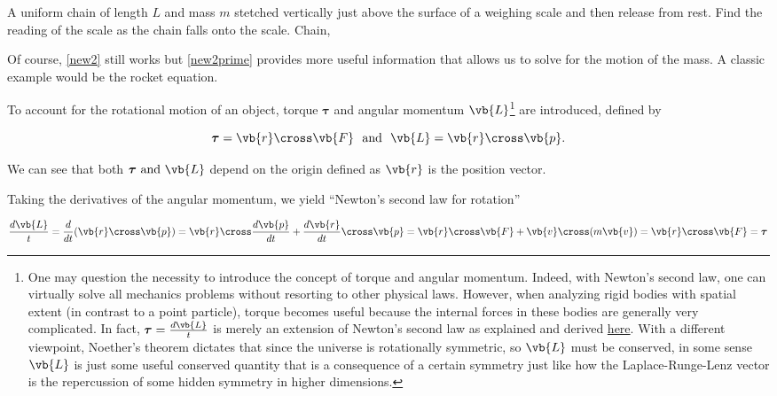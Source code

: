 \documentclass[a4paper,12pt]{report}
\begin{document}
{A uniform chain of length \(L\) and mass \(m\) stetched vertically just above the surface of a weighing scale and then release from rest. Find the reading of the scale as the chain falls onto the scale.}
{Chain, } 



Of course, \cref{new2} still works but \cref{new2prime} provides more useful information that allows us to solve for the motion of the mass. A classic example would be the rocket equation.

To account for the rotational motion of an object, torque \(\boldsymbol{\tau } \) and angular momentum \(\vb{L} \)\footnote{One may question the necessity to introduce the concept of torque and angular momentum. Indeed, with Newton's second law, one can virtually solve all mechanics problems without resorting to other physical laws. However, when analyzing rigid bodies with spatial extent (in contrast to a point particle), torque becomes useful because the internal forces in these bodies are generally very complicated. In fact, \(\boldsymbol{\tau } = \frac{d \vb{L}}{t} \) is merely an extension of Newton's second law as explained and derived \href{https://knzhou.github.io/handouts/M2Sol.pdf}{here}. With a different viewpoint, Noether's theorem dictates that since the universe is rotationally symmetric, so \(\vb{L} \) must be conserved, in some sense \(\vb{L}\) is just some useful conserved quantity that is a consequence of a certain symmetry just like how the Laplace-Runge-Lenz vector is the repercussion of some hidden symmetry in higher dimensions.} are introduced, defined by

\begin{equation}
	\boldsymbol{\tau } = \vb{r} \cross \vb{F} ~\text { and }~ \vb{L} = \vb{r} \cross \vb{p} . 
\end{equation}

We can see that both \(\boldsymbol{\tau } \text{ and } \vb{L} \) depend on the origin defined as \(\vb{r} \) is the position vector.

Taking the derivatives of the angular momentum, we yield ``Newton's second law for rotation''

\begin{equation}
	\frac{d \vb{L}}{t} = \frac{d}{dt} (\vb{r} \cross \vb{p} ) = \vb{r} \cross \frac{d\vb{p} }{dt}  + \frac{d \vb{r}}{dt} \cross \vb{p} = \vb{r} \cross \vb{F} + \vb{v} \cross (m\vb{v} ) = \vb{r} \cross \vb{F} = \boldsymbol{\tau}  
\end{equation}
\end{document}
